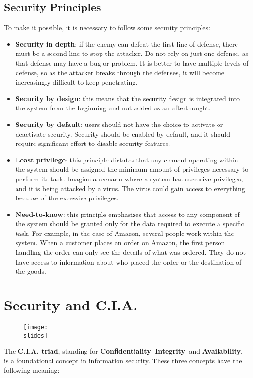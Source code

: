 \subsection*{Security Principles}
To make it possible, it is necessary to follow some security principles:
\begin{itemize}
  \item \textbf{Security in depth}: if the enemy can defeat the first line of defense, there must be a second line to stop the attacker. Do not rely on just one defense, as that defense may have a bug or problem. It is better to have multiple levels of defense, so as the attacker breaks through the defenses, it will become increasingly difficult to keep penetrating.

  \item \textbf{Security by design}: this means that the security design is integrated into the system from the beginning and not added as an afterthought.

  \item \textbf{Security by default}: users should not have the choice to activate or deactivate security. Security should be enabled by default, and it should require significant effort to disable security features.

  \item \textbf{Least privilege}: this principle dictates that any element operating within the system should be assigned the minimum amount of privileges necessary to perform its task. Imagine a scenario where a system has excessive privileges, and it is being attacked by a virus. The virus could gain access to everything because of the excessive privileges.

  \item \textbf{Need-to-know}: this principle emphasizes that access to any component of the system should be granted only for the data required to execute a specific task. For example, in the case of Amazon, several people work within the system. When a customer places an order on Amazon, the first person handling the order can only see the details of what was ordered. They do not have access to information about who placed the order or the destination of the goods.
\end{itemize}

\section{Security and C.I.A.}
\begin{figure}[h]
  \centering
  \texttt{[image: \\slides]}
\end{figure}
The \textbf{C.I.A. triad}, standing for \textbf{Confidentiality}, \textbf{Integrity}, and \textbf{Availability}, is a foundational concept in information security.
These three concepts have the following meaning:

